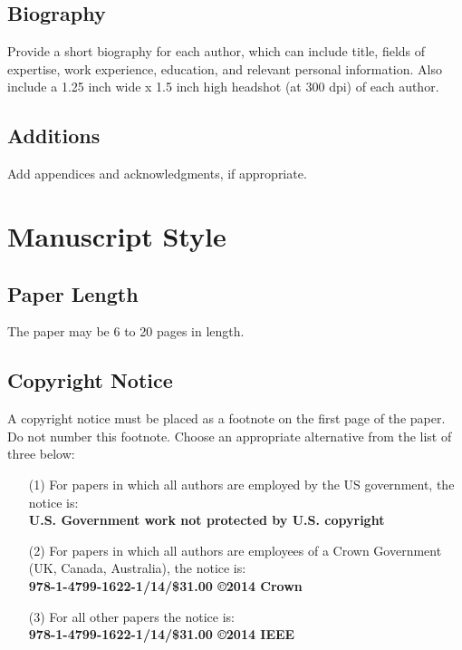 \documentclass[twocolumn,letterpaper]{IEEEAerospaceCLS}  %
\begin{document}
\subsection{Biography}
Provide a short biography for each author, which can include title, fields of expertise, work experience, education, and relevant personal information. Also include a 1.25 inch wide x 1.5 inch high headshot (at 300 dpi) of each author.

\subsection{Additions}
Add appendices and acknowledgments, if appropriate.



\section{Manuscript Style}

\subsection{Paper Length}
The paper may be 6 to 20 pages in length.

\subsection{Copyright Notice}
A copyright notice must be placed as a footnote on the first page of the paper. Do not number this footnote. Choose an appropriate alternative from the list of three below:
\begin{itemize}
  \item [(1)] For papers in which all authors are employed by the US government, the notice is: \\{\bf U.S. Government work not protected by U.S. copyright} \\
  \item [(2)] For papers in which all authors are employees of a Crown Government (UK, Canada, Australia), the notice is: \\{\bf 978-1-4799-1622-1/14/\$31.00 \copyright2014 Crown} \\
  \item [(3)] For all other papers the notice is: \\{\bf 978-1-4799-1622-1/14/\$31.00 \copyright2014 IEEE}
\end{itemize}
\end{document}
